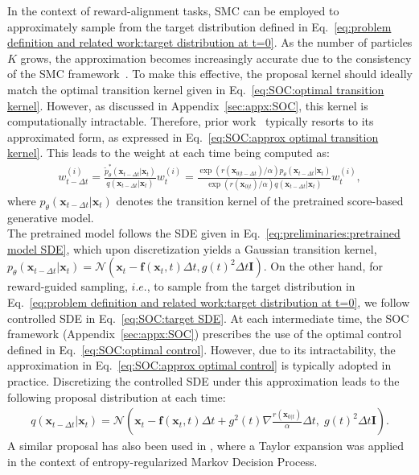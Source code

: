 In the context of reward-alignment tasks, SMC can be employed to approximately sample from the target distribution defined in Eq.~\ref{eq:problem definition and related work:target distribution at t=0}. As the number of particles $K$ grows, the approximation becomes increasingly accurate due to the consistency of the SMC framework~\cite{Chopin_2004, moral2004feynman}.
To make this effective, the proposal kernel should ideally match the optimal transition kernel given in Eq.~\ref{eq:SOC:optimal transition kernel}. However, as discussed in Appendix~\ref{sec:appx:SOC}, this kernel is computationally intractable. Therefore, prior work~\cite{wu2023tds, kim2025DAS, uehara2025inference} typically resorts to its approximated form, as expressed in Eq.~\ref{eq:SOC:approx optimal transition kernel}. This leads to the weight at each time being computed as:
\begin{align}
    w_{t-\Delta t}^{(i)}=\frac{\tilde{p}_{\theta}^*(\mathbf{x}_{t-\Delta t}|\mathbf{x}_{t})}{q(\mathbf{x}_{t-\Delta t}|\mathbf{x}_{t})}w_t^{(i)}=\frac{\exp (r(\mathbf{x}_{0|t-\Delta t})/\alpha)p_\theta(\mathbf{x}_{t-\Delta t}|\mathbf{x}_{t})}{\exp (r(\mathbf{x}_{0|t})/\alpha)q(\mathbf{x}_{t-\Delta t}|\mathbf{x}_{t})}w_t^{(i)},
\end{align}
where $p_\theta (\mathbf{x}_{t-\Delta t}|\mathbf{x}_t)$ denotes the transition kernel of the pretrained score-based generative model.\\
The pretrained model follows the SDE given in Eq.~\ref{eq:preliminaries:pretrained model SDE}, which upon discretization yields a Gaussian transition kernel, $p_\theta(\mathbf{x}_{t-\Delta t}|\mathbf{x}_t)=\mathcal{N}(\mathbf{x}_t-\mathbf{f}(\mathbf{x}_t,t)\Delta t, g(t)^2\Delta t \mathbf{I})$.
On the other hand, for reward-guided sampling, $i.e.$, to sample from the target distribution in Eq.~\ref{eq:problem definition and related work:target distribution at t=0}, we follow controlled SDE in Eq.~\ref{eq:SOC:target SDE}. At each intermediate time, the SOC framework (Appendix~\ref{sec:appx:SOC}) prescribes the use of the optimal control defined in Eq.~\ref{eq:SOC:optimal control}. However, due to its intractability, the approximation in Eq.~\ref{eq:SOC:approx optimal control} is typically adopted in practice. Discretizing the controlled SDE under this approximation leads to the following proposal distribution at each time:
\begin{align}
    q(\mathbf{x}_{t-\Delta t}|\mathbf{x}_{t})=\mathcal{N}(\mathbf{x}_t-\mathbf{f}(\mathbf{x}_t,t)\Delta t+g^2(t)\nabla \frac{r(\mathbf{x}_{0|t})}{\alpha}\Delta t,\;g(t)^2\Delta t \mathbf{I}).
\end{align}
A similar proposal has also been used in \cite{kim2025DAS, uehara2025inference}, where a Taylor expansion was applied in the context of entropy-regularized Markov Decision Process.